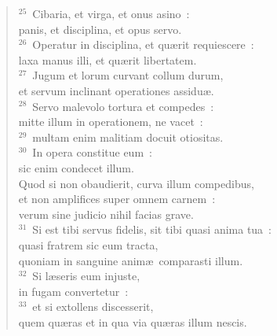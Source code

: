 \begin{verse}${}^{25}$~Cibaria, et virga, et onus asino~:\\ panis, et disciplina, et opus servo.\\
${}^{26}$~Operatur in disciplina, et qu\ae rit requiescere~:\\ laxa manus illi, et qu\ae rit libertatem.\\
${}^{27}$~Jugum et lorum curvant collum durum,\\ et servum inclinant operationes assidu\ae .\\
${}^{28}$~Servo malevolo tortura et compedes~:\\ mitte illum in operationem, ne vacet~:\\
${}^{29}$~multam enim malitiam docuit otiositas.\\
${}^{30}$~In opera constitue eum~:\\ sic enim condecet illum.\\ Quod si non obaudierit, curva illum compedibus,\\ et non amplifices super omnem carnem~:\\ verum sine judicio nihil facias grave.\\
${}^{31}$~Si est tibi servus fidelis, sit tibi quasi anima tua~:\\ quasi fratrem sic eum tracta,\\ quoniam in sanguine anim\ae\ comparasti illum.\\
${}^{32}$~Si l\ae seris eum injuste,\\ in fugam convertetur~:\\
${}^{33}$~et si extollens discesserit,\\ quem qu\ae ras et in qua via qu\ae ras illum nescis.\end{verse}


